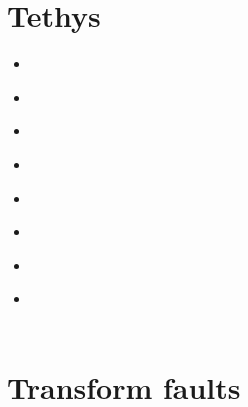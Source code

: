 \section{Tethys} 

\begin{scriptsize}
\begin{itemize}
\item[\nineteenninetynine] 
\textcite{vasb99} \\
\item[\twothousand] 
\textcite{mokd00} \\
\item[\twothousandeleven] 
\textcite{befa11} \\
\item[\twothousandthirteen]
\textcite{wagw13} \\
\item[\twothousandsixteen] 
\textcite{necg16} \\
\item[\twothousandeighteen] 
\textcite{marc18} \\
\item[\twothousandtwentyone] 
\textcite{gupg21b}  \\
\item[\twothousandtwentytwo] 
\textcite{gupg22}  \\
\textcite{lala22}  \\
\end{itemize}
\end{scriptsize}

\section{Transform faults} 

